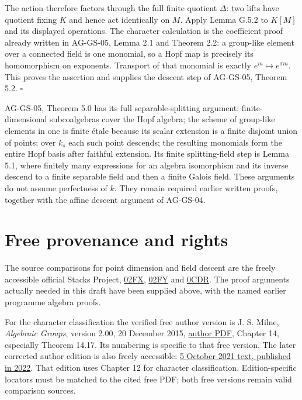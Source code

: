 \documentclass[11pt,a4paper,openany]{report}
\begin{document}
The action therefore factors through the full finite quotient \(\Delta\): two lifts have quotient fixing \(K\) and hence act identically on \(M\). Apply Lemma G.5.2 to \(K[M]\) and its displayed operations. The character calculation is the coefficient proof already written in AG-GS-05, Lemma 2.1 and Theorem 2.2: a group-like element over a connected field is one monomial, so a Hopf map is precisely its homomorphism on exponents. Transport of that monomial is exactly \(e^m\mapsto e^{\sigma m}\). This proves the assertion and supplies the descent step of AG-GS-05, Theorem 5.2. \(\square\)

AG-GS-05, Theorem 5.0 has its full separable-splitting argument: finite-dimensional subcoalgebras cover the Hopf algebra; the scheme of group-like elements in one is finite étale because its scalar extension is a finite disjoint union of points; over \(k_s\) each such point descends; the resulting monomials form the entire Hopf basis after faithful extension. Its finite splitting-field step is Lemma 5.1, where finitely many expressions for an algebra isomorphism and its inverse descend to a finite separable field and then a finite Galois field. These arguments do not assume perfectness of \(k\). They remain required earlier written proofs, together with the affine descent argument of AG-GS-04.

\section{Free provenance and rights}\label{AG-RG-S08-free-provenance-and-rights}

The source comparisons for point dimension and field descent are the freely accessible official Stacks Project, \href{https://stacks.math.columbia.edu/tag/02FX}{02FX}, \href{https://stacks.math.columbia.edu/tag/02FY}{02FY} and \href{https://stacks.math.columbia.edu/tag/0CDR}{0CDR}. The proof arguments actually needed in this draft have been supplied above, with the named earlier programme algebra proofs.

For the character classification the verified free author version is J. S. Milne, \emph{Algebraic Groups}, version 2.00, 20 December 2015, \href{https://www.jmilne.org/math/CourseNotes/iAG200.pdf}{author PDF}, Chapter 14, especially Theorem 14.17. Its numbering is specific to that free version. The later corrected author edition is also freely accessible: \href{https://www.jmilne.org/math/Books/iAG2022.pdf}{5 October 2021 text, published in 2022}. That edition uses Chapter 12 for character classification. Edition-specific locators must be matched to the cited free PDF; both free versions remain valid comparison sources.
\end{document}
